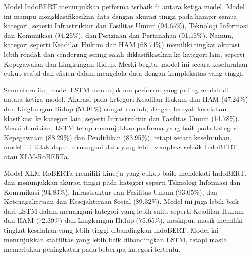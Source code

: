 \documentclass[12pt,a4paper]{article}
\begin{document}
\begin{adjustwidth}{3em}{0pt} 
\hspace{0.5cm} Model IndoBERT menunjukkan performa terbaik di antara ketiga model. Model ini mampu mengklasifikasikan data dengan akurasi tinggi pada hampir semua kategori, seperti Infrastruktur dan Fasilitas Umum (94.65\%), Teknologi Informasi dan Komunikasi (94.25\%), dan Perizinan dan Pertanahan (91.15\%). Namun, kategori seperti Keadilan Hukum dan HAM (68.71\%) memiliki tingkat akurasi lebih rendah dan cenderung sering salah diklasifikasikan ke kategori lain, seperti Kepegawaian dan Lingkungan Hidup. Meski begitu, model ini secara keseluruhan cukup stabil dan efisien dalam mengelola data dengan kompleksitas yang tinggi.

\hspace{0.5cm} Sementara itu, model LSTM menunjukkan performa yang paling rendah di antara ketiga model. Akurasi pada kategori Keadilan Hukum dan HAM (47.24\%) dan Lingkungan Hidup (53.91\%) sangat rendah, dengan banyak kesalahan klasifikasi ke kategori lain, seperti Infrastruktur dan Fasilitas Umum (14.78\%). Meski demikian, LSTM tetap menunjukkan performa yang baik pada kategori Kepegawaian (88.29\%) dan Pendidikan (83.95\%), tetapi secara keseluruhan, model ini tidak dapat menangani data yang lebih kompleks sebaik IndoBERT atau XLM-RoBERTa.

\hspace{0.5cm} Model XLM-RoBERTa memiliki kinerja yang cukup baik, mendekati IndoBERT, dan menunjukkan akurasi tinggi pada kategori seperti Teknologi Informasi dan Komunikasi (94.83\%), Infrastruktur dan Fasilitas Umum (93.05\%), dan Ketenagakerjaan dan Kesejahteraan Sosial (89.32\%). Model ini juga lebih baik dari LSTM dalam menangani kategori yang lebih sulit, seperti Keadilan Hukum dan HAM (72.39\%) dan Lingkungan Hidup (75.65\%), meskipun masih memiliki tingkat kesalahan yang lebih tinggi dibandingkan IndoBERT. Model ini menunjukkan stabilitas yang lebih baik dibandingkan LSTM, tetapi masih memerlukan peningkatan pada beberapa kategori tertentu.

\end{adjustwidth}
\end{document}
